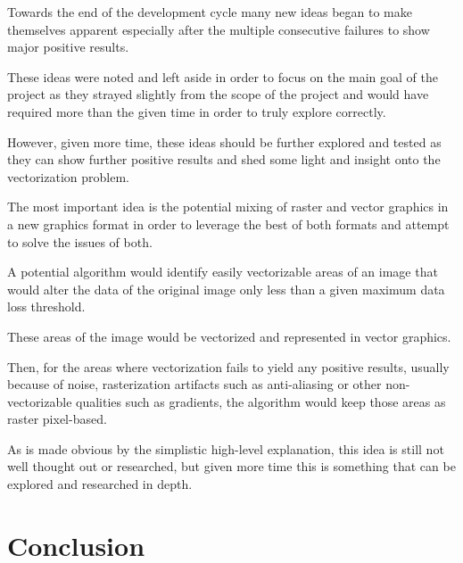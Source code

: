 \documentclass[12pt]{article}
\newcommand{\sentence}{} %
\begin{document}
    \tab
    Towards the end of the development cycle many new ideas began to make themselves apparent especially
    after the multiple consecutive failures to show major positive results.
    \sentence
    These ideas were noted and left aside in order to focus on the main goal of the project as they strayed slightly
    from the scope of the project and would have required more than the given time in order to truly explore correctly.
    \sentence
    However, given more time, these ideas should be further explored and tested as they can show further positive
    results and shed some light and insight onto the vectorization problem.
    \sentence
    The most important idea is the potential mixing of raster and vector graphics in a new graphics format in order
    to leverage the best of both formats and attempt to solve the issues of both.
    \sentence
    A potential algorithm would identify easily vectorizable areas of an image that would alter the data of the
    original image only less than a given maximum data loss threshold.
    \sentence
    These areas of the image would be vectorized and represented in vector graphics.
    \sentence
    Then, for the areas where vectorization fails to yield any positive results, usually because of noise,
    rasterization artifacts such as anti-aliasing or other non-vectorizable qualities such as gradients, the
    algorithm would keep those areas as raster pixel-based.
    \sentence
    As is made obvious by the simplistic high-level explanation, this idea is still not well thought out or
    researched, but given more time this is something that can be explored and researched in depth.

    \pagebreak


    \section{Conclusion}\label{sec:conclusion}


    \pagebreak


    \printbibliography[heading=bibintoc,title={References}]

    \pagebreak
\end{document}
